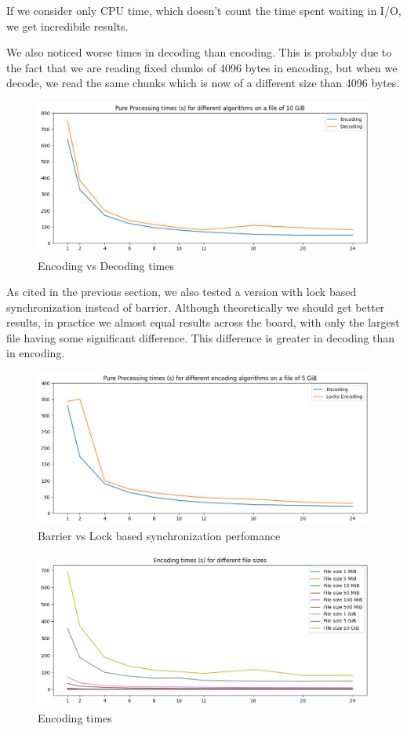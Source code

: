 If we consider only CPU time, which doesn't count the time spent waiting in I/O, we get incredibile results.
 
We also noticed worse times in decoding than encoding. This is probably due to the fact that we are reading fixed chunks of 4096 bytes in encoding, but when we decode, we read the same chunks which is now of a different size than 4096 bytes. 

\begin{figure}
	\centering
	\includegraphics[width=0.8\linewidth]{"../imgs/Encoding vs Decoding"}
	\caption{Encoding vs Decoding times}
	\label{fig:encoding-vs-decoding}
\end{figure}

As cited in the previous section, we also tested a version with lock based synchronization instead of barrier. Although theoretically we should get better results, in practice we almost equal results across the board, with only the largest file having some significant difference. This difference is greater in decoding than in encoding.
\begin{figure}
	\centering
	\includegraphics[width=0.8\linewidth]{"../imgs/Barrier vs Locks encoding"}
	\caption{Barrier vs Lock based synchronization perfomance}
	\label{fig:barrier-vs-locks-encoding}
\end{figure}

\begin{figure}
	\centering
	\includegraphics[width=0.8\linewidth]{"../imgs/Encoding Barrier times"}
	\caption{Encoding times}
	\label{fig:encoding-barrier-times}
\end{figure}

